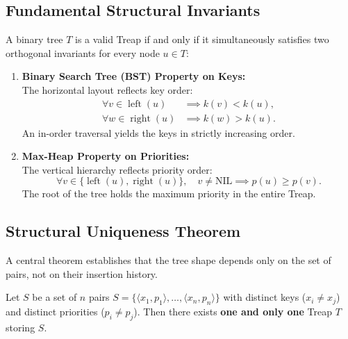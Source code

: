 \subsection{Fundamental Structural Invariants}
A binary tree $T$ is a valid Treap if and only if it simultaneously satisfies two orthogonal invariants for every node $u \in T$:

\begin{enumerate}
    \item \textbf{Binary Search Tree (BST) Property on Keys:}\\
    The horizontal layout reflects key order:
    \begin{align}
      \forall v \in \operatorname{left}(u)  &\implies k(v) < k(u), \\
      \forall w \in \operatorname{right}(u) &\implies k(w) > k(u).
    \end{align}
    An in-order traversal yields the keys in strictly increasing order.

    \item \textbf{Max-Heap Property on Priorities:}\\
    The vertical hierarchy reflects priority order:
    \begin{equation}
      \forall v \in \{\operatorname{left}(u), \operatorname{right}(u)\}, \quad v \neq \text{NIL} \implies p(u) \ge p(v).
    \end{equation}
    The root of the tree holds the maximum priority in the entire Treap.
\end{enumerate}

\subsection{Structural Uniqueness Theorem}
A central theorem establishes that the tree shape depends only on the set of pairs, not on their insertion history.

\begin{theorem}
\label{thm:treap-uniqueness-en}
Let $S$ be a set of $n$ pairs $S = \{ \langle x_1, p_1 \rangle, \dots, \langle x_n, p_n \rangle \}$ with distinct keys ($x_i \neq x_j$) and distinct priorities ($p_i \neq p_j$). Then there exists \textbf{one and only one} Treap $T$ storing $S$.
\end{theorem}

